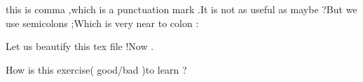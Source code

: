 \documentclass{article}
\begin{document}
this is comma    ,which is a punctuation mark .It is not as useful as maybe   ?But we use semicolons ;Which is very near to colon :

Let us beautify this tex file !Now .

How is this exercise(  good/bad  )to learn ?
\end{document}
